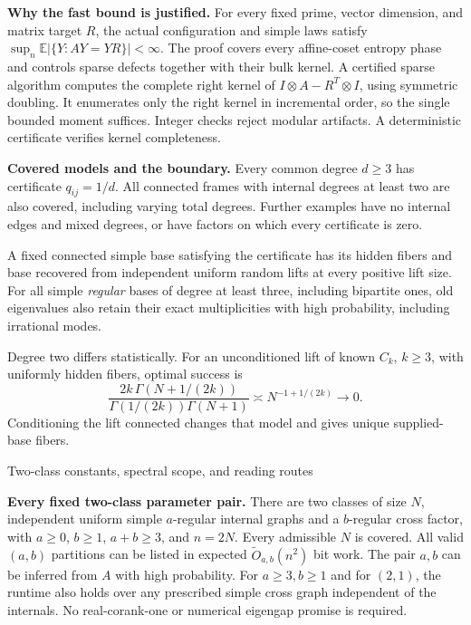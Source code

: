 \documentclass[10pt]{article}
\newcommand{\E}{\mathbb E}
\begin{document}
\textbf{Why the fast bound is justified.}
For every fixed prime, vector dimension, and matrix target $R$,
the actual configuration and simple laws satisfy
$\sup_n\E|\{Y:AY=YR\}|<\infty$. The proof covers every affine-coset
entropy phase and controls sparse defects together with their bulk
kernel. A certified sparse algorithm computes the complete right
kernel of $I\otimes A-R^T\otimes I$, using symmetric doubling.
It enumerates only the right kernel in incremental order, so the
single bounded moment suffices. Integer checks reject modular artifacts.
A deterministic certificate verifies kernel completeness.

\textbf{Covered models and the boundary.}
Every common degree $d\ge3$ has certificate $q_{ij}=1/d$.
All connected frames with internal degrees at least two are also covered,
including varying total degrees. Further examples have no internal edges
and mixed degrees, or have factors on which every certificate is zero.

A fixed connected simple base satisfying the certificate has its hidden
fibers and base recovered from independent uniform random lifts at every
positive lift size. For all simple \emph{regular} bases of degree at least
three, including bipartite ones, old eigenvalues also retain their exact
multiplicities with high probability, including irrational modes.

Degree two differs statistically. For an unconditioned lift of known
$C_k$, $k\ge3$, with uniformly hidden fibers, optimal success is
\[
 \frac{2k\,\Gamma(N+1/(2k))}
 {\Gamma(1/(2k))\Gamma(N+1)}
 \asymp N^{-1+1/(2k)}\longrightarrow0.
\]
Conditioning the lift connected changes that model and gives unique
supplied-base fibers.

\newpage
{\Large Two-class constants, spectral scope, and reading routes}

\textbf{Every fixed two-class parameter pair.}
There are two classes of size $N$, independent uniform simple
$a$-regular internal graphs and a $b$-regular cross factor, with
$a\ge0$, $b\ge1$, $a+b\ge3$, and $n=2N$. Every admissible $N$ is covered.
All valid $(a,b)$ partitions can be listed in expected
$\widetilde O_{a,b}(n^2)$ bit work. The pair $a,b$ can be inferred from $A$ with high probability.
For $a\ge3,b\ge1$ and for $(2,1)$, the runtime also holds over any prescribed
simple cross graph independent of the internals. No real-corank-one or numerical eigengap promise is required.
\end{document}
